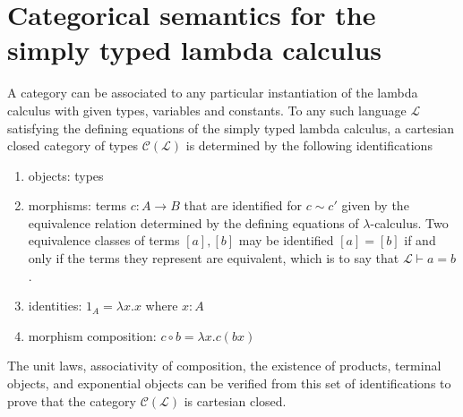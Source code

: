\section{Categorical semantics for the simply typed lambda calculus}
A category can be associated to any particular instantiation of the lambda calculus with given types, variables and constants. To any such language $\mathcal{L}$ satisfying the defining equations of the simply typed lambda calculus, a cartesian closed category of types $\mathcal{C}(\mathcal{L})$ is determined by the following identifications
\begin{enumerate}
\item{objects: } types
\item{morphisms: } terms $c \colon A \rightarrow B$ that are identified for $c \sim c'$ given by the equivalence relation determined by the defining equations of $\lambda$-calculus. Two equivalence classes of terms $[a], [b]$ may be identified $[a] = [b]$ if and only if the terms they represent are equivalent, which is to say that  $\mathcal{L} \vdash a = b$.
\item{identities: } $1_A = \lambda x.x$ where $x \colon A$
\item{morphism composition: } $c \circ b = \lambda x.c(bx)$
\end{enumerate}
The unit laws, associativity of composition, the existence of products, terminal objects, and exponential objects can be verified from this set of identifications to prove that the category $\mathcal{C}(\mathcal{L})$ is cartesian closed.

